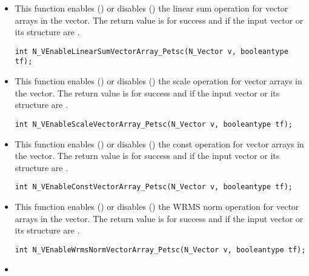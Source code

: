 \begin{itemize}

\item {}

This function enables () or disables () the linear sum
operation for vector arrays in the {\petsc} vector. The return value is  for
success and  if the input vector or its  structure are .

\verb|int N_VEnableLinearSumVectorArray_Petsc(N_Vector v, booleantype tf);|


\item {}

This function enables () or disables () the scale
operation for vector arrays in the {\petsc} vector. The return value is  for
success and  if the input vector or its  structure are .

\verb|int N_VEnableScaleVectorArray_Petsc(N_Vector v, booleantype tf);|


\item {}

This function enables () or disables () the const
operation for vector arrays in the {\petsc} vector. The return value is  for
success and  if the input vector or its  structure are .

\verb|int N_VEnableConstVectorArray_Petsc(N_Vector v, booleantype tf);|


\item {}

This function enables () or disables () the WRMS norm
operation for vector arrays in the {\petsc} vector. The return value is  for
success and  if the input vector or its  structure are .

\verb|int N_VEnableWrmsNormVectorArray_Petsc(N_Vector v, booleantype tf);|


\item {}


\end{itemize}
